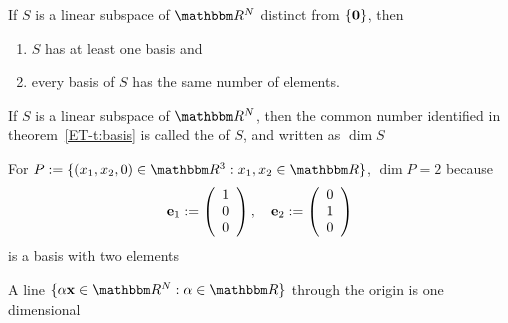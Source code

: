 \begin{frame}

    \vspace{2em}
    \Thm{\eqref{ET-t:basis}}
    If $S$ is a linear subspace of $\RR^N$ distinct from $\{{\mathbf 0}\}$, then 
    \begin{enumerate}
        \item $S$ has at least one basis and
        \item every basis of $S$ has the same number of elements.
    \end{enumerate}
    If $S$ is a linear subspace of $\RR^N$, then the common number identified in
    theorem~\ref{ET-t:basis} is called the  of $S$, and written as
    $\dim S$
    
\end{frame}

\begin{frame}
    
    \vspace{2em}
    \Eg
    For $P := \setntn{(x_1, x_2, 0) \in \RR^3}{ x_1, x_2 \in \RR}$, $\dim P = 2$ because 
    \begin{equation*}
        {\mathbf e}_1 := 
        \left(
        \begin{array}{c}
            1 \\
            0 \\
            0
        \end{array}
        \right),
        \quad 
        {\mathbf e}_2 := 
        \left(
        \begin{array}{c}
            0 \\
            1 \\
            0
        \end{array}
        \right)
    \end{equation*}
    is a basis with two elements
    
    \vspace{.7em}
    \Eg
    A line $\setntn{\alpha \boldx \in \RR^N}{\alpha \in \RR}$ through
    the origin is one dimensional
    
\end{frame}

